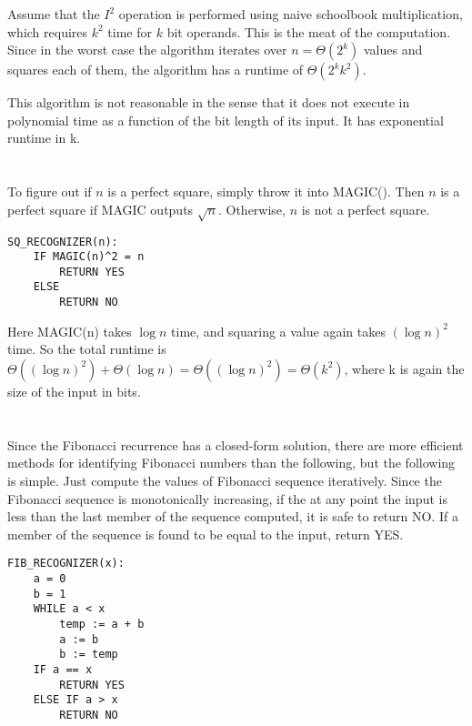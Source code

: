 \documentclass{article}
\begin{document}
\vspace{1em}

Assume that the $I^2$ operation is performed using naive schoolbook 
multiplication, which requires $k^2$ time for $k$ bit operands.
This is the meat of the computation. Since in the worst case the
algorithm iterates over $n = \Theta(2^k)$ values and squares each of them, the
algorithm has a runtime of $\Theta(2^kk^2)$. 

\vspace{1em}

This algorithm is not reasonable in the sense that it does
not execute in polynomial time as a function of the bit length of its input.
It has exponential runtime in k.

\section{}
To figure out if $n$ is a perfect square, simply throw it into MAGIC(). Then
$n$ is a perfect square if MAGIC outputs $\sqrt{n}$. Otherwise, $n$ is not a
perfect square.

\begin{verbatim}
SQ_RECOGNIZER(n):
    IF MAGIC(n)^2 = n
        RETURN YES
    ELSE
        RETURN NO
\end{verbatim}

Here MAGIC(n) takes $\log n$ time, and squaring a value again takes 
$(\log n)^2$ time. So the total runtime is
$\Theta((\log n)^2) + \Theta(\log n) = \Theta((\log n)^2) = \Theta(k^2)$, where
k is again the size of the input in bits.

\section{}
Since the Fibonacci recurrence has a closed-form solution, there are more
efficient methods for identifying Fibonacci numbers than the following, but the
following is simple. Just compute the values of Fibonacci sequence iteratively.
Since the
Fibonacci sequence is monotonically increasing, if the at any point the input
is less than the last member of the sequence computed, it is safe to return NO.
If a member of the sequence is found to be equal to the input, return YES.

\begin{verbatim}
FIB_RECOGNIZER(x):
    a = 0
    b = 1
    WHILE a < x
        temp := a + b
        a := b
        b := temp
    IF a == x
        RETURN YES
    ELSE IF a > x
        RETURN NO
\end{verbatim}
\end{document}
